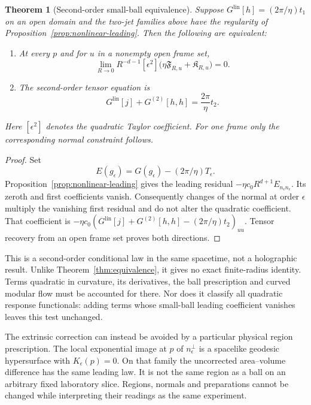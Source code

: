 \documentclass[12pt]{article}
\newtheorem{theorem}{Theorem}[section]
\theoremstyle{definition}
\theoremstyle{remark}
\newcommand{\Glin}{G^{\mathrm{lin}}}
\begin{document}
\begin{theorem}[Second-order small-ball equivalence]
\label{thm:secondorder}
Suppose $\Glin[h]=(2\pi/\eta)t_1$ on an open domain and the two-jet
families above have the regularity of Proposition~\ref{prop:nonlinear-leading}.
Then the following are equivalent:
\begin{enumerate}[label=(\alph*),leftmargin=2em,itemsep=1pt]
\item At every $p$ and for $u$ in a nonempty open frame set,
\[
 \lim_{R\to0}R^{-d-1}
 [\epsilon^2]\bigl(\eta\mathfrak F_{R,u}
                         +\mathfrak K_{R,u}\bigr)=0.
\]
\item The second-order tensor equation is
\[
 \Glin[j]+G^{(2)}[h,h]=\frac{2\pi}{\eta}t_2.
\]
\end{enumerate}
Here $[\epsilon^2]$ denotes the quadratic Taylor coefficient. For one
frame only the corresponding normal constraint follows.
\end{theorem}
\begin{proof}
Set
\[
 E(g_\epsilon)=G(g_\epsilon)-(2\pi/\eta)T_\epsilon.
\]
Proposition~\ref{prop:nonlinear-leading} gives the leading residual
$-\eta c_0R^{d+1}E_{n_\epsilon n_\epsilon}$.
Its zeroth and first coefficients vanish. Consequently changes of the
normal at order $\epsilon$ multiply the vanishing first residual and do
not alter the quadratic coefficient. That coefficient is
$-\eta c_0(\Glin[j]+G^{(2)}[h,h]-(2\pi/\eta)t_2)_{uu}$.
Tensor recovery from an open frame set proves both directions.
\end{proof}

This is a second-order conditional law in the same spacetime, not a
holographic result. Unlike Theorem~\ref{thm:equivalence}, it gives no exact
finite-radius identity. Terms quadratic in curvature, its derivatives,
the ball prescription and curved modular flow must be accounted for there.
Nor does it classify all quadratic response functionals: adding terms
whose small-ball leading coefficient vanishes leaves this test unchanged.

The extrinsic correction can instead be avoided by a particular physical
region prescription. The local exponential image at $p$ of
$n_\epsilon^\perp$ is a spacelike geodesic hypersurface with
$K_\epsilon(p)=0$. On that family the uncorrected area--volume difference
has the same leading law. It is not the same region as a ball on an
arbitrary fixed laboratory slice. Regions, normals and preparations cannot
be changed while interpreting their readings as the same experiment.
\end{document}
